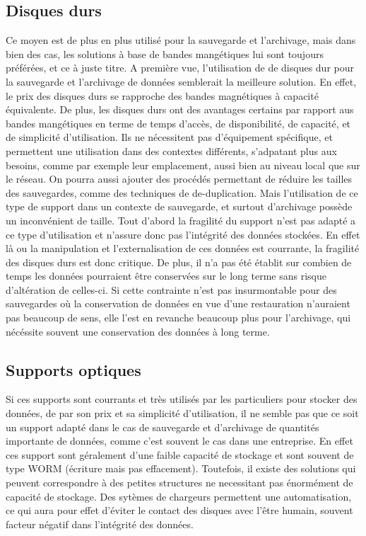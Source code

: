 \documentclass[a4paper,11pt]{report}
\begin{document}
\subsection{Disques durs}
Ce moyen est de plus en plus utilisé pour la sauvegarde et l'archivage, mais dans bien des cas, les solutions à base de bandes mangétiques lui sont toujours préférées, et ce à juste titre.
A première vue, l'utilisation de de disques dur pour la sauvegarde et l'archivage de données semblerait la meilleure solution.
En effet, le prix des disques durs se rapproche des bandes magnétiques à capacité équivalente. De plus, les disques durs ont des avantages certains par rapport aus bandes mangétiques en terme de temps d'accès, de disponibilité, de capacité, et de simplicité d'utilisation.
Ils ne nécessitent pas d'équipement spécifique, et permettent une utilisation dans des contextes différents, s'adpatant plus aux besoins, comme par exemple leur emplacement, aussi bien au niveau local que sur le réseau.
On pourra aussi ajouter des procédés permettant de réduire les tailles des sauvegardes, comme des techniques de de-duplication.
Mais l'utilisation de ce type de support dans un contexte de sauvegarde, et surtout d'archivage possède un inconvénient de taille. Tout d'abord la fragilité du support n'est pas adapté a ce type d'utilisation et n'assure donc pas l'intégrité des données stockées. 
En effet là ou la manipulation et l'externalisation de ces données est courrante, la fragilité des disques durs est donc critique.
De plus, il n'a pas été établit sur combien de temps les données pourraient être conservées sur le long terme sans risque d'altération de celles-ci.
Si cette contrainte n'est pas insurmontable pour des sauvegardes où la conservation de données en vue d'une restauration n'auraient pas beaucoup de sens, elle l'est en revanche beaucoup plus pour l'archivage, qui nécéssite souvent une conservation des données à long terme.

\subsection{Supports optiques}
Si ces supports sont courrants et très utilisés par les particuliers pour stocker des données, de par son prix et sa simplicité d'utilisation, il ne semble pas que ce soit un support adapté dans le cas de sauvegarde et d'archivage de quantités importante de données, comme c'est souvent le cas dans une entreprise.
En effet ces support sont géralement d'une faible capacité de stockage et sont souvent de type WORM (écriture mais pas effacement).
Toutefois, il existe des solutions qui peuvent correspondre à des petites structures ne necessitant pas énormément de capacité de stockage.
Des sytèmes de chargeurs permettent une automatisation, ce qui aura pour effet d'éviter le contact des disques avec l'être humain, souvent facteur négatif dans l'intégrité des données.
\end{document}
